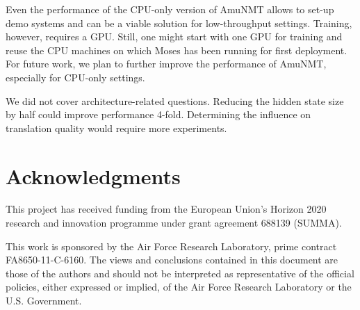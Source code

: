 \documentclass[11pt]{article}
\begin{document}
Even the performance of the CPU-only version of AmuNMT allows to set-up demo systems and can be a viable solution for low-throughput settings. Training, however, requires a GPU. Still, one might start with one GPU for training and reuse the CPU machines on which Moses has been running  for first deployment. For future work, we plan to further improve the performance of AmuNMT, especially for CPU-only settings.

We did not cover architecture-related questions. Reducing the hidden state size by half could improve performance 4-fold. Determining the influence on translation quality would require more experiments.

\section{Acknowledgments}
This project has received funding from the European Union's Horizon 2020 research and innovation
programme under grant agreement 688139 (SUMMA).

This work is sponsored by the Air Force Research Laboratory, prime contract FA8650-11-C-6160.  The views and conclusions contained in this document are those of the authors and should not be interpreted as representative of the official policies, either expressed or implied, of the Air Force Research Laboratory or the U.S. Government.



\end{document}
